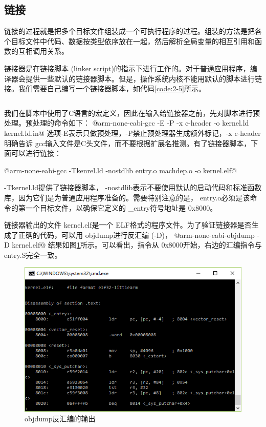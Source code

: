 \documentclass[main.tex]{subfiles}
\begin{document}
\begin{CJK*}{UTF8}{song}
\section{链接}
链接的过程就是把多个目标文件组装成一个可执行程序的过程。组装的方法是把各个目标文件中代码、数据按类型依序放在一起，然后解析全局变量的相互引用和函数的互相调用关系。
\par
链接器是在链接脚本 (linker script)的指示下进行工作的。对于普通应用程序，编译器会提供一些默认的链接器脚本。但是，操作系统内核不能用默认的脚本进行链接。我们需要自己编写一个链接器脚本，如代码\ref{code:2-5}所示。

\begin{code}
\label{code:2-5}
\inputminted[linenos,numbersep=5pt,frame=lines,framesep=2mm]{c}{src/chapter02/kernel/kernel.ld.in}
\end{code}


我们在脚本中使用了C语言的宏定义，因此在输入给链接器之前，先对脚本进行预处理。预处理的命令如下：
@arm-none-eabi-gcc -E -P -x c-header -o kernel.ld kernel.ld.in@
\noindent
选项-E表示只做预处理，-P禁止预处理器生成额外标记，-x c-header明确告诉 gcc输入文件是C头文件，而不要根据扩展名推测。有了链接器脚本，下面可以进行链接：

@arm-none-eabi-gcc -Tkenrel.ld -nostdlib entry.o machdep.o -o kernel.elf@

\noindent
-Tkernel.ld提供了链接器脚本， -nostdlib表示不要使用默认的启动代码和标准函数库，因为它们是为普通应用程序准备的。需要特别注意的是， entry.o必须是该命令的第一个目标文件，以确保它定义的 \_entry符号地址是 0x8000。
\par
链接器输出的文件 kernel.elf是一个 ELF格式的程序文件。为了验证链接器是否生成了正确的代码，可以用 objdump进行反汇编 (-D)，
@arm-none-eabi-objdump -D kernel.elf@
\noindent
结果如图\ref{figure:2-1}所示。可以看出，指令从 0x8000开始，右边的汇编指令与 entry.S完全一致。

\begin{figure}[htp]
\centering
\includegraphics[scale=0.5]{figures/2-1.png}
\caption{objdump反汇编的输出}
\label{figure:2-1}
\end{figure}


\end{CJK*}
\end{document}
